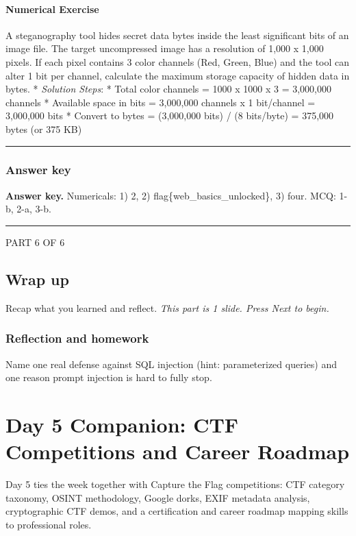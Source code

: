 \documentclass[12pt,openany]{book}
\begin{document}
\subsubsection*{Numerical Exercise}


A steganography tool hides secret data bytes inside the least significant bits of an image file. The target uncompressed image has a resolution of 1,000 x 1,000 pixels. If each pixel contains 3 color channels (Red, Green, Blue) and the tool can alter 1 bit per channel, calculate the maximum storage capacity of hidden data in bytes.
* \textit{Solution Steps}:
    * Total color channels = 1000 x 1000 x 3 = 3,000,000 channels
    * Available space in bits = 3,000,000 channels x 1 bit/channel = 3,000,000 bits
    * Convert to bytes = (3,000,000 bits) / (8 bits/byte) = 375,000 bytes (or 375 KB)


\medskip\noindent\rule{\linewidth}{0.4pt}\medskip

\medskip

\subsection*{Answer key}


\textbf{Answer key.} Numericals: 1) 2, 2) flag\{web\_basics\_unlocked\}, 3) four. MCQ: 1-b, 2-a, 3-b.


\medskip\noindent\rule{\linewidth}{0.4pt}\medskip

\medskip

\vspace{4pt}\noindent\textsc{PART 6 OF 6}


\section*{Wrap up}

Recap what you learned and reflect.
{\small\itshape\color{gray}This part is 1 slide. Press Next to begin.}

\medskip

\subsection*{Reflection and homework}


Name one real defense against SQL injection (hint: parameterized queries) and one reason prompt injection is hard to fully stop.

\medskip

\chapter{Day 5 Companion: CTF Competitions and Career Roadmap}
Day 5 ties the week together with Capture the Flag competitions: CTF category taxonomy, OSINT methodology, Google dorks, EXIF metadata analysis, cryptographic CTF demos, and a certification and career roadmap mapping skills to professional roles.
\end{document}
